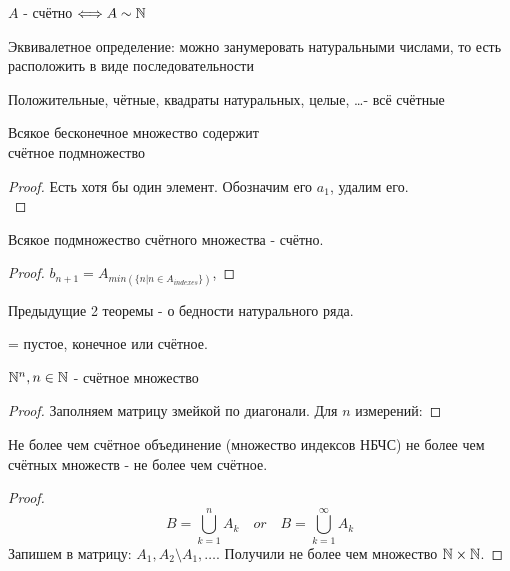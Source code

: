 \documentclass[12pt, a4paper]{article}
\begin{document}
  \begin{definition}
  $A$ - счётно $\Longleftrightarrow A \sim  {\mathbb{N}}$

  Эквивалетное определение: можно занумеровать 
  натуральными числами, то есть расположить
    в виде последовательности
  \end{definition}

  \begin{example}
  Положительные, чётные, квадраты натуральных, целые, \dots - всё счётные
  \end{example}

  \begin{theorem}
  Всякое бесконечное множество содержит\\
    счётное подмножество  
  \end{theorem}
  \begin{proof}
  Есть хотя бы один элемент. Обозначим его $a_1$, удалим его. \\
  \inductdots 
  \end{proof}


  \begin{theorem}
  Всякое подмножество счётного множества - счётно.  
  \end{theorem}
  \begin{proof}
  $b_{n + 1} = A_{min(\{n | n \in A_{indexes}\})}$, \inductdots
  \end{proof}

  Предыдущие 2 теоремы - о бедности натурального ряда.

  \begin{definition}
    = пустое, конечное или счётное.
  \end{definition}

  \begin{lemma}
  ${\mathbb{N}}^n, n \in {\mathbb{N}}$ - счётное множество
  \end{lemma}
  \begin{proof}
  Заполняем матрицу змейкой по диагонали.
  Для $n$ измерений: \inductdots
  \end{proof}

  \begin{theorem}
  Не более чем счётное объединение (множество индексов НБЧС) 
  не более чем счётных множеств - не более чем счётное.
  \end{theorem}
  \begin{proof}
  \begin{equation}
    B = \bigcup_{k = 1}^{n} A_k \quad or \quad B = \bigcup_{k = 1}^{\infty} A_k
  \end{equation}
  Запишем в матрицу: $A_1, A_2 \setminus A_1, \ldots$. Получили не более чем множество ${\mathbb{N}} \times {\mathbb{N}}$.
  \end{proof}
\end{document}
